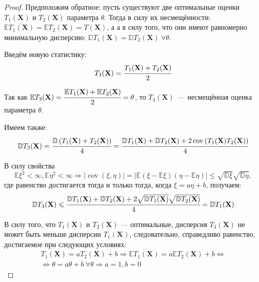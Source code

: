 \begin{proof}
Предположим обратное: пусть существуют две оптимальные оценки $T_1(\mathbf{X})$ и $T_2(\mathbf{X})$ параметра $\theta$. Тогда в силу их несмещённости: $\mathbb{E} T_{1}(\mathbf{X})=\mathbb{E} T_{2}(\mathbf{X})=T(\mathbf{X})$, а а в силу того, что они имеют равномерно минимальную дисперсию: $\mathbb{D} T_{1}(\mathbf{X})=\mathbb{D} T_{2}(\mathbf{X})~ \forall \theta$.

Введём новую статистику: 
\begin{equation}
    T_{3}(\mathbf{X})=\cfrac{T_{1}(\mathbf{X})+T_{2}(\mathbf{X})}{2}
\end{equation}

Так как $\mathbb{E} T_{3}(\mathbf{X})=\cfrac{\mathbb{E} T_{1}(\mathbf{X})+\mathbb{E} T_{2}(\mathbf{X})}{2}=\theta$, то $T_{3}(\mathbf{X})$~--- несмещённая оценка параметра $\theta$.

Имеем также:
\begin{equation*}
    \mathbb{D} T_{3}(\mathbf{X})=\cfrac{\mathbb{D}\left(T_{1}(\mathbf{X})+T_{2}(\mathbf{X})\right)}{4} =
    \cfrac{\mathbb{D} T_{1}(\mathbf{X})+\mathbb{D} T_{2}(\mathbf{X})+2 \operatorname{cov}\left(T_{1}(\mathbf{X}) T_{2}(\mathbf{X})\right)}{4}
\end{equation*}

В силу свойства
\begin{equation*}
    \mathbb{E} \xi^{2}<\infty, \mathbb{E} \eta^{2}<\infty \Rightarrow|\operatorname{cov}(\xi, \eta)| = | \mathbb{E}(\xi-\mathbb{E} \xi)(\eta-\mathbb{E} \eta)| \leqslant \sqrt{\mathbb{D} \xi} \sqrt{\mathbb{D} \eta},
\end{equation*}
где равенство достигается тогда и только тогда, когда $\xi=a \eta+b$, получаем:
\begin{equation*}
    \mathbb{D} T_{3}(\mathbf{X}) \leqslant \cfrac{\mathbb{D} T_{1}(\mathbf{X})+\mathbb{D} T_{2}(\mathbf{X})+2 \sqrt{\mathbb{D} T_{1}(\mathbf{X})} \sqrt{\mathbb{D} T_{2}(\mathbf{X})}}{4} =\mathbb{D} T_{1}(\mathbf{X})
\end{equation*}

В силу того, что $T_1(\mathbf{X})$ и $T_2(\mathbf{X})$ — оптимальные, дисперсия $T_3(\mathbf{X})$ не может быть меньше дисперсии $T_1(\mathbf{X})$, следовательно, справедливо равенство, достигаемое при следующих условиях:
\begin{equation*}
\begin{aligned}
    T_{1}(\mathbf{X})=a T_{2}(\mathbf{X})+b \Rightarrow \mathbb{E} T_{1}(\mathbf{X})
    = a \mathbb{E} T_{2}(\mathbf{X})+b 
    \Leftrightarrow \\
    \Leftrightarrow \theta = a \theta + b~ \forall \theta \Rightarrow a = 1, b = 0
\end{aligned}
\end{equation*}

\end{proof}


